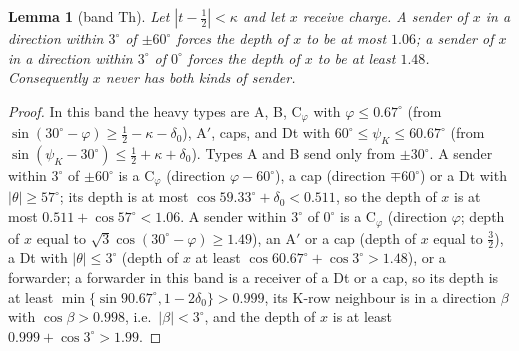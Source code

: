 \documentclass[11pt]{amsart}
\newtheorem{lemma}[theorem]{Lemma}
\theoremstyle{definition}
\theoremstyle{remark}
\begin{document}
\begin{lemma}[band Th]\label{lem:Th}
Let $|t-\frac12|<\kappa$ and let $x$ receive charge. A sender of $x$ in a direction within $3^\circ$ of $\pm60^\circ$ forces the depth of $x$ to be at most $1.06$; a sender of $x$ in a direction within $3^\circ$ of $0^\circ$ forces the depth of $x$ to be at least $1.48$. Consequently $x$ never has both kinds of sender.
\end{lemma}
\begin{proof}
In this band the heavy types are A, B, C$_\varphi$ with $\varphi\le0.67^\circ$ (from $\sin(30^\circ-\varphi)\ge\frac12-\kappa-\delta_0$), A$'$, caps, and Dt with $60^\circ\le\psi_K\le60.67^\circ$ (from $\sin(\psi_K-30^\circ)\le\frac12+\kappa+\delta_0$). Types A and B send only from $\pm30^\circ$. A sender within $3^\circ$ of $\pm60^\circ$ is a C$_\varphi$ (direction $\varphi-60^\circ$), a cap (direction $\mp60^\circ$) or a Dt with $|\theta|\ge57^\circ$; its depth is at most $\cos59.33^\circ+\delta_0<0.511$, so the depth of $x$ is at most $0.511+\cos57^\circ<1.06$. A sender within $3^\circ$ of $0^\circ$ is a C$_\varphi$ (direction $\varphi$; depth of $x$ equal to $\sqrt3\cos(30^\circ-\varphi)\ge1.49$), an A$'$ or a cap (depth of $x$ equal to $\frac32$), a Dt with $|\theta|\le3^\circ$ (depth of $x$ at least $\cos60.67^\circ+\cos3^\circ>1.48$), or a forwarder; a forwarder in this band is a receiver of a Dt or a cap, so its depth is at least $\min\{\sin90.67^\circ,1-2\delta_0\}>0.999$, its K-row neighbour is in a direction $\beta$ with $\cos\beta>0.998$, i.e.\ $|\beta|<3^\circ$, and the depth of $x$ is at least $0.999+\cos3^\circ>1.99$.
\end{proof}
\end{document}
